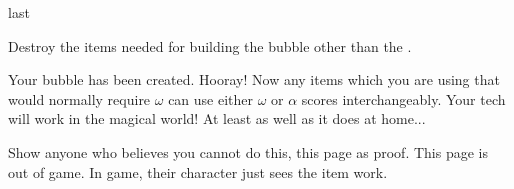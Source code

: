 \documentclass[greennotebook]{guildcamp3} %
\begin{document}
\begin{page}[at last...]{last}
	
Destroy the items needed for building the bubble other than the \iScrewdriver{}.

Your bubble has been created. Hooray! Now any items which you are using that would normally require $\omega$ can use either $\omega$ or $\alpha$ scores interchangeably. Your tech will work in the magical world! At least as well as it does at home... 

Show anyone who believes you cannot do this, this page as proof. This page is out of game. In game, their character just sees the item work. 


\end{page}



\endnotebook
\end{document}
